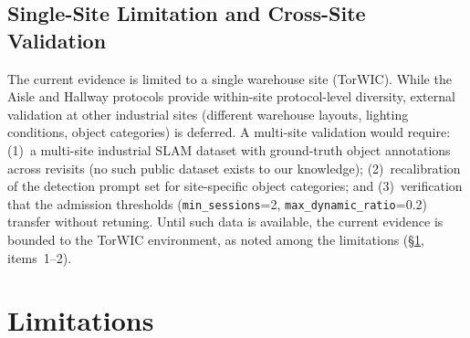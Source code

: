 \documentclass[journal]{IEEEtran}
\begin{document}
\subsection{Single-Site Limitation and Cross-Site Validation}
\label{sec:disc_cross_site}

The current evidence is limited to a single warehouse site (TorWIC). While the Aisle and Hallway protocols provide within-site protocol-level diversity, external validation at other industrial sites (different warehouse layouts, lighting conditions, object categories) is deferred. A multi-site validation would require: (1)~a multi-site industrial SLAM dataset with ground-truth object annotations across revisits (no such public dataset exists to our knowledge); (2)~recalibration of the detection prompt set for site-specific object categories; and (3)~verification that the admission thresholds (\texttt{min\_sessions}{=}2, \texttt{max\_dynamic\_ratio}{=}0.2) transfer without retuning. Until such data is available, the current evidence is bounded to the TorWIC environment, as noted among the limitations (\S\ref{sec:limitations}, items~1--2).

\section{Limitations}
\label{sec:limitations}
\end{document}

